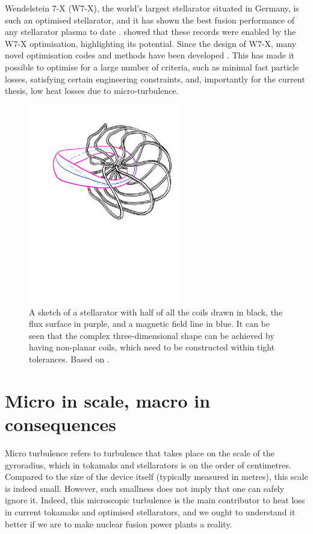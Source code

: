 Wendelstein 7-X (W7-X), the world's largest stellarator situated in Germany, is such an optimised stellarator, and it has shown the best fusion performance of any stellarator plasma to date \cite{wolf2017major,wolf2019performance}. \citet{beidler2021demonstration} showed that these records were enabled by the W7-X optimisation, highlighting its potential. Since the design of W7-X, many novel optimisation codes and methods have been developed \cite{wagner1998stellarators,spong2001physics,kovari2014process,kovari2016process,drevlak2018optimisation,dudt2020desc,landreman2021simsopt,mcgreivy2021optimized}. This has made it possible to optimise for a large number of criteria, such as minimal fast particle losses, satisfying certain engineering constraints, and, importantly for the current thesis, low heat losses due to micro-turbulence.

\begin{figure}
    \centering
    \includegraphics[width=0.6\textwidth]{3_chapters/0_introduction/img/stellarator-sketch.pdf}
    \caption{A sketch of a stellarator with half of all the coils drawn in black, the flux surface in purple, and a magnetic field line in blue. It can be seen that the complex three-dimensional shape can be achieved by having non-planar coils, which need to be constructed within tight tolerances. Based on \citet{wechsung2022precise}.}
    \label{fig: sketch stellarator}
\end{figure}



\section{Micro in scale, macro in consequences}
\label{sec: chap1 background}
Micro turbulence refers to turbulence that takes place on the scale of the gyroradius, which in tokamaks and stellarators is on the order of centimetres. Compared to the size of the device itself (typically measured in metres), this scale is indeed small. However, such smallness does not imply that one can safely ignore it.  Indeed, this microscopic turbulence is the main contributor to heat loss in current tokamaks and optimised stellarators, and we ought to understand it better if we are to make nuclear fusion power plants a reality. \par  

